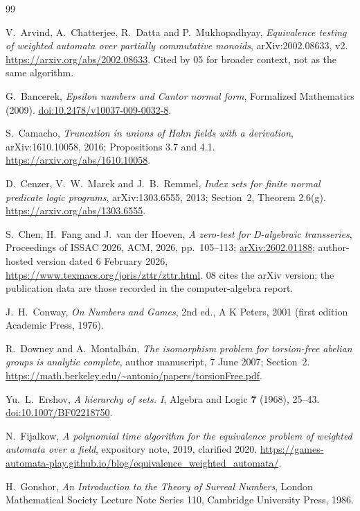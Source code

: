 \documentclass[11pt,oneside]{article}
\numberwithin{equation}{section}
\theoremstyle{definition}
\theoremstyle{remark}
\begin{document}
\begin{thebibliography}{99}
\raggedright
{}
V.~Arvind, A.~Chatterjee, R.~Datta and P.~Mukhopadhyay, \emph{Equivalence testing
of weighted automata over partially commutative monoids}, arXiv:2002.08633, v2.
\url{https://arxiv.org/abs/2002.08633}. Cited by 05 for broader context, not as
the same algorithm.

G.~Bancerek, \emph{Epsilon numbers and Cantor normal form}, Formalized Mathematics
(2009). \href{https://doi.org/10.2478/v10037-009-0032-8}{doi:10.2478/v10037-009-0032-8}.

S.~Camacho, \emph{Truncation in unions of Hahn fields with a derivation},
arXiv:1610.10058, 2016; Propositions 3.7 and 4.1.
\url{https://arxiv.org/abs/1610.10058}.

D.~Cenzer, V.~W.~Marek and J.~B.~Remmel, \emph{Index sets for finite normal predicate
logic programs}, arXiv:1303.6555, 2013; Section~2, Theorem 2.6(g).
\url{https://arxiv.org/abs/1303.6555}.

S.~Chen, H.~Fang and J.~van der Hoeven, \emph{A zero-test for D-algebraic
transseries}, Proceedings of ISSAC 2026, ACM, 2026, pp.~105--113;
\href{https://arxiv.org/abs/2602.01188}{arXiv:2602.01188}; author-hosted version
dated 6 February 2026, \url{https://www.texmacs.org/joris/zttr/zttr.html}. 08 cites
the arXiv version; the publication data are those recorded in the computer-algebra
report.

J.~H.~Conway, \emph{On Numbers and Games}, 2nd ed., A K Peters, 2001 (first edition
Academic Press, 1976).

R.~Downey and A.~Montalb\'an, \emph{The isomorphism problem for torsion-free abelian
groups is analytic complete}, author manuscript, 7 June 2007; Section~2.
\url{https://math.berkeley.edu/~antonio/papers/torsionFree.pdf}.

Yu.~L.~Ershov, \emph{A hierarchy of sets. I}, Algebra and Logic \textbf{7} (1968),
25--43. \href{https://doi.org/10.1007/BF02218750}{doi:10.1007/BF02218750}.

N.~Fijalkow, \emph{A polynomial time algorithm for the equivalence problem of
weighted automata over a field}, expository note, 2019, clarified 2020.
\url{https://games-automata-play.github.io/blog/equivalence_weighted_automata/}.

H.~Gonshor, \emph{An Introduction to the Theory of Surreal Numbers}, London
Mathematical Society Lecture Note Series 110, Cambridge University Press, 1986.


\end{thebibliography}
\end{document}
